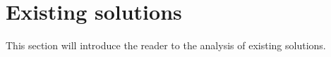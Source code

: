 
\chapter{Existing solutions}\label{ch:existing-solutions}

This section will introduce the reader to the analysis of existing solutions.







